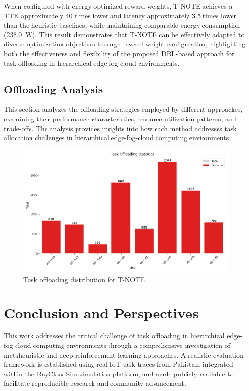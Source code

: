 \documentclass{svproc}
\begin{document}
When configured with energy-optimized reward weights, T-NOTE achieves a TTR approximately 40 times lower and latency approximately 3.5 times lower than the heuristic baselines, while maintaining comparable energy consumption (238.0~W). This result demonstrates that T-NOTE can be effectively adapted to diverse optimization objectives through reward weight configuration, highlighting both the effectiveness and flexibility of the proposed DRL-based approach for task offloading in hierarchical edge-fog-cloud environments.

\subsection{Offloading Analysis}\label{subsec:offloading-analysis}

This section analyzes the offloading strategies employed by different approaches, examining their performance characteristics, resource utilization patterns, and trade-offs. The analysis provides insights into how each method addresses task allocation challenges in hierarchical edge-fog-cloud computing environments.

\begin{figure}[H]
    \centering
    \includegraphics[width=0.5\linewidth]{figs/T-NOTE4E/task_offloading_statistics.png}
    \caption{Task offloading distribution for T-NOTE}
    \label{fig:T-NOTE-offloading-stats}
\end{figure}


\section{Conclusion and Perspectives}\label{sec:conclusion}

This work addresses the critical challenge of task offloading in hierarchical edge-fog-cloud computing environments through a comprehensive investigation of metaheuristic and deep reinforcement learning approaches. A realistic evaluation framework is established using real IoT task traces from Pakistan, integrated within the RayCloudSim simulation platform, and made publicly available to facilitate reproducible research and community advancement.
\end{document}
